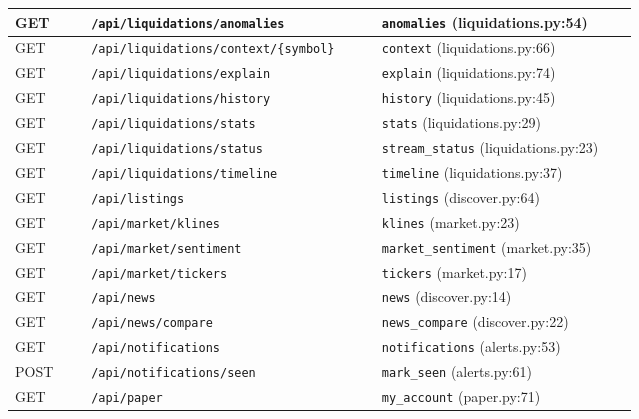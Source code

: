 {\begin{longtable}{|>{\centering\arraybackslash}p{0.11\linewidth}|p{0.42\linewidth}|p{0.37\linewidth}|}
GET & \texttt{/\allowbreak{}api/\allowbreak{}liquidations/\allowbreak{}anomalies} & \texttt{anomalies} (liquidations.py:54)\\\hline
GET & \texttt{/\allowbreak{}api/\allowbreak{}liquidations/\allowbreak{}context/\allowbreak{}\{symbol\}} & \texttt{context} (liquidations.py:66)\\\hline
GET & \texttt{/\allowbreak{}api/\allowbreak{}liquidations/\allowbreak{}explain} & \texttt{explain} (liquidations.py:74)\\\hline
GET & \texttt{/\allowbreak{}api/\allowbreak{}liquidations/\allowbreak{}history} & \texttt{history} (liquidations.py:45)\\\hline
GET & \texttt{/\allowbreak{}api/\allowbreak{}liquidations/\allowbreak{}stats} & \texttt{stats} (liquidations.py:29)\\\hline
GET & \texttt{/\allowbreak{}api/\allowbreak{}liquidations/\allowbreak{}status} & \texttt{stream\_\allowbreak{}status} (liquidations.py:23)\\\hline
GET & \texttt{/\allowbreak{}api/\allowbreak{}liquidations/\allowbreak{}timeline} & \texttt{timeline} (liquidations.py:37)\\\hline
GET & \texttt{/\allowbreak{}api/\allowbreak{}listings} & \texttt{listings} (discover.py:64)\\\hline
GET & \texttt{/\allowbreak{}api/\allowbreak{}market/\allowbreak{}klines} & \texttt{klines} (market.py:23)\\\hline
GET & \texttt{/\allowbreak{}api/\allowbreak{}market/\allowbreak{}sentiment} & \texttt{market\_\allowbreak{}sentiment} (market.py:35)\\\hline
GET & \texttt{/\allowbreak{}api/\allowbreak{}market/\allowbreak{}tickers} & \texttt{tickers} (market.py:17)\\\hline
GET & \texttt{/\allowbreak{}api/\allowbreak{}news} & \texttt{news} (discover.py:14)\\\hline
GET & \texttt{/\allowbreak{}api/\allowbreak{}news/\allowbreak{}compare} & \texttt{news\_\allowbreak{}compare} (discover.py:22)\\\hline
GET & \texttt{/\allowbreak{}api/\allowbreak{}notifications} & \texttt{notifications} (alerts.py:53)\\\hline
POST & \texttt{/\allowbreak{}api/\allowbreak{}notifications/\allowbreak{}seen} & \texttt{mark\_\allowbreak{}seen} (alerts.py:61)\\\hline
GET & \texttt{/\allowbreak{}api/\allowbreak{}paper} & \texttt{my\_\allowbreak{}account} (paper.py:71)\\\hline

\end{longtable}}

